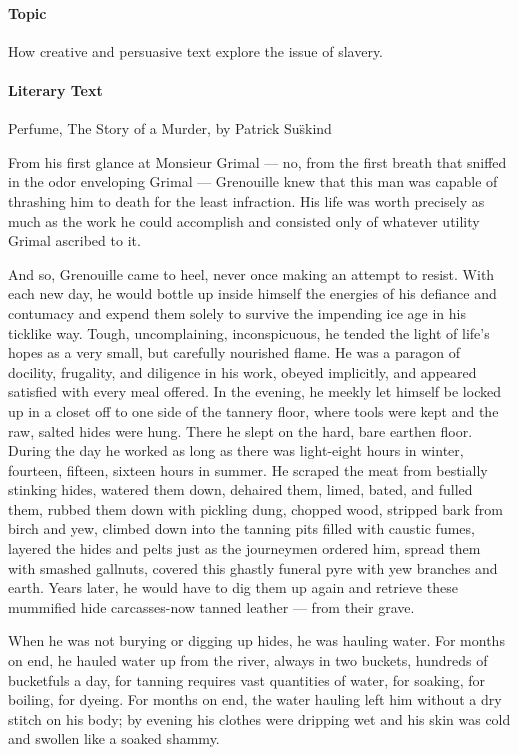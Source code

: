 \documentclass[a4paper,12pt]{article}
\begin{document}
\paragraph{Topic}
How creative and persuasive text explore the issue of slavery.

\paragraph{Literary Text}
Perfume, The Story of a Murder, by Patrick Su\"skind

\begin{linenumbers}
    From his first glance at Monsieur Grimal --- no, from the first breath that sniffed in the odor
enveloping Grimal --- Grenouille knew that this man was capable of thrashing him to death for the least
infraction. His life was worth precisely as much as the work he could accomplish and consisted only of
whatever utility Grimal ascribed to it.

And so, Grenouille came to heel, never once making an attempt
to  resist.  With  each  new  day,  he  would  bottle  up  inside  himself  the  energies  of  his  defiance  and
contumacy  and  expend  them  solely  to  survive  the  impending  ice  age  in  his  ticklike  way.  Tough,
uncomplaining,  inconspicuous,  he  tended  the  light  of  life’s  hopes  as  a  very  small,  but  carefully
nourished flame. He was a paragon of docility, frugality, and diligence in his work, obeyed implicitly,
and appeared satisfied with every meal offered. In the evening, he meekly let himself be locked up in a
closet off to one side of the tannery floor, where tools were kept and the raw, salted hides were hung.
There  he  slept  on  the  hard,  bare  earthen  floor.  During  the  day  he  worked  as  long  as  there  was
light-eight  hours  in  winter,  fourteen,  fifteen,  sixteen  hours  in  summer.  He  scraped  the  meat  from
bestially  stinking  hides,  watered  them  down,  dehaired  them,  limed,  bated, and fulled  them,  rubbed
them down with pickling dung, chopped wood, stripped bark from birch and yew, climbed down into
the tanning pits filled with caustic fumes, layered the hides and pelts just as the journeymen ordered
him,  spread  them  with  smashed  gallnuts,  covered  this  ghastly  funeral  pyre  with  yew  branches  and
earth.  Years  later,  he  would  have  to  dig  them  up  again  and  retrieve  these  mummified  hide
carcasses-now tanned leather --- from their grave.

When he was not burying or digging up hides, he was hauling water. For months on end, he
hauled  water  up  from  the  river,  always  in  two  buckets,  hundreds  of  bucketfuls  a  day,  for  tanning
requires vast quantities of water, for soaking, for boiling, for dyeing. For months on end, the water
hauling left him without a dry stitch on his body; by evening his clothes were dripping wet and his skin
was cold and swollen like a soaked shammy.
\end{linenumbers}
\end{document}
